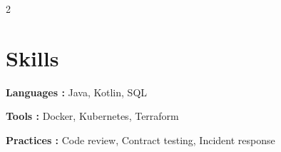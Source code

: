 \documentclass[10pt]{extarticle}
\begin{document}
\begin{multicols}{2}
\section{Skills}

\begin{tightlist}
    \item[] \textbf{Languages :} Java, Kotlin, SQL

    \item[] \textbf{Tools :} Docker, Kubernetes, Terraform

    \item[] \textbf{Practices :} Code review, Contract testing, Incident response

\end{tightlist}
\end{multicols}
\end{document}
